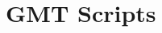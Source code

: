 \documentclass[minerals,article,accept,pdftex,moreauthors]{Definitions/mdpi}
\begin{document}
\appendixstart
\appendix
\section[\appendixname~\thesection]{GMT Scripts} \label{app}
\subsection[\appendixname~\thesubsection]{} %

\setcounter{lstlisting}{0}
\renewcommand\thelstlisting{A\arabic{lstlisting}} 
\end{document}

